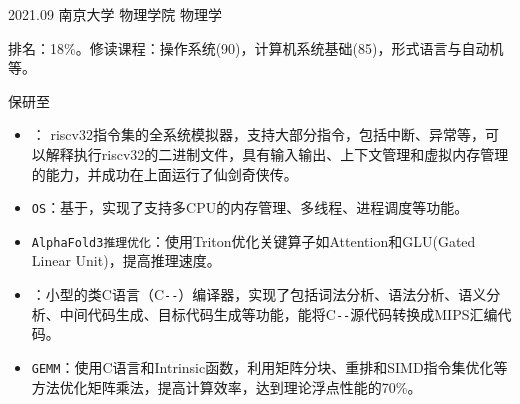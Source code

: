 \documentclass[zh]{resume}
\begin{document}
\makeheader


\begin{educations}
  \education%
  {2021.09}%
  {南京大学}%
  {物理学院}%
  {物理学}%
\item 排名：18\%。修读课程：操作系统(90)，计算机系统基础(85)，形式语言与自动机等。
\item 保研至
\end{educations}


\begin{itemize}
  \item {}：
riscv32指令集的全系统模拟器，支持大部分指令，包括中断、异常等，可以解释执行riscv32的二进制文件，具有输入输出、上下文管理和虚拟内存管理的能力，并成功在上面运行了仙剑奇侠传。
\item \texttt{OS}：基于，实现了支持多CPU的内存管理、多线程、进程调度等功能。
\item \texttt{AlphaFold3推理优化}：使用Triton优化关键算子如Attention和GLU(Gated Linear Unit)，提高推理速度。
\item {}：小型的类C语言（C\verb!--!）编译器，实现了包括词法分析、语法分析、语义分析、中间代码生成、目标代码生成等功能，能将C\verb!--!源代码转换成MIPS汇编代码。
\item \texttt{GEMM}：使用C语言和Intrinsic函数，利用矩阵分块、重排和SIMD指令集优化等方法优化矩阵乘法，提高计算效率，达到理论浮点性能的70\%。
\end{itemize}
\end{document}
